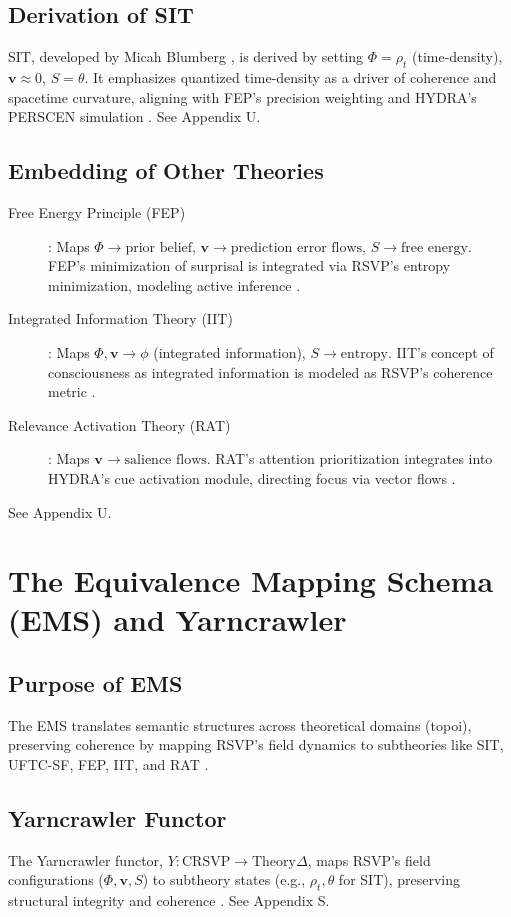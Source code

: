 \documentclass[12pt]{report}
\newcommand{\PhiRSVP}{\Phi}
\newcommand{\vRSVP}{\mathbf{v}}
\newcommand{\SRSVP}{S}
\begin{document}
\section{Derivation of SIT}
SIT, developed by Micah Blumberg \citep{Blumberg2022}, is derived by setting \(\PhiRSVP = \rho_t\) (time-density), \(\vRSVP \approx 0\), \(\SRSVP = \theta\). It emphasizes quantized time-density as a driver of coherence and spacetime curvature, aligning with FEP’s precision weighting and HYDRA’s PERSCEN simulation \citep{Friston2010, HYDRA2025}. See Appendix U.

\section{Embedding of Other Theories}
\begin{description}
    \item[Free Energy Principle (FEP)]: Maps \(\PhiRSVP \to \text{prior belief}\), \(\vRSVP \to \text{prediction error flows}\), \(\SRSVP \to \text{free energy}\). FEP’s minimization of surprisal is integrated via RSVP’s entropy minimization, modeling active inference \citep{Friston2010}.
    \item[Integrated Information Theory (IIT)]: Maps \(\PhiRSVP, \vRSVP \to \phi\) (integrated information), \(\SRSVP \to \text{entropy}\). IIT’s concept of consciousness as integrated information is modeled as RSVP’s coherence metric \citep{Tononi2016}.
    \item[Relevance Activation Theory (RAT)]: Maps \(\vRSVP \to \text{salience flows}\). RAT’s attention prioritization integrates into HYDRA’s cue activation module, directing focus via vector flows \citep{RAT2025}.
\end{description}
See Appendix U.

\chapter{The Equivalence Mapping Schema (EMS) and Yarncrawler}
\section{Purpose of EMS}
The EMS translates semantic structures across theoretical domains (topoi), preserving coherence by mapping RSVP’s field dynamics to subtheories like SIT, UFTC-SF, FEP, IIT, and RAT \citep{RSVPMeta2025}.

\section{Yarncrawler Functor}
The Yarncrawler functor, \(Y: \text{CRSVP} \to \text{Theory}\Delta\), maps RSVP’s field configurations (\(\PhiRSVP, \vRSVP, \SRSVP\)) to subtheory states (e.g., \(\rho_t, \theta\) for SIT), preserving structural integrity and coherence \citep{SocioeconomicFunctors2025}. See Appendix S.
\end{document}
